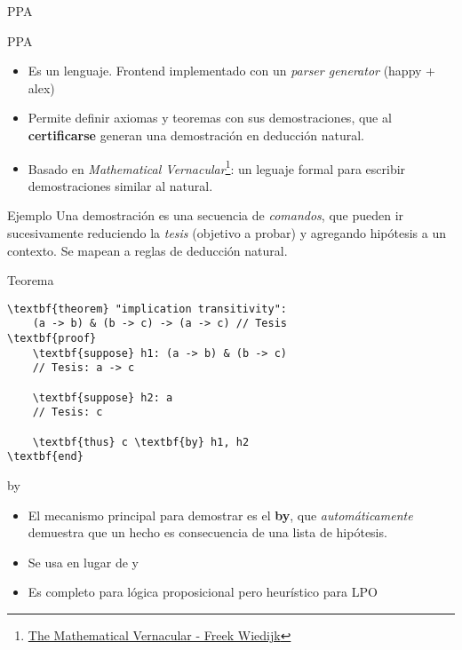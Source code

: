 \documentclass[xcolor={dvipsnames},spanish]{beamer}
\begin{document}
\begin{frame}{PPA}
    \begin{figure}
    \centering
\end{figure}
\end{frame}

\begin{frame}{PPA}
    \begin{itemize}
        \item Es un lenguaje. Frontend implementado con un \textit{parser generator} (happy + alex)
        \item Permite definir axiomas y teoremas con sus demostraciones, que al \textbf{certificarse} generan una demostración en deducción natural.
        \item Basado en \textit{Mathematical Vernacular}\footnote{\href{https://www.cs.ru.nl/~freek/notes/mv.pdf}{The Mathematical Vernacular - Freek Wiedijk}}: un leguaje formal para escribir demostraciones similar al natural.
    \end{itemize}
\end{frame}


\begin{frame}[fragile]{Ejemplo}
    Una demostración es una secuencia de \textit{comandos}, que pueden ir sucesivamente reduciendo la \textit{tesis} (objetivo a probar) y agregando hipótesis a un contexto. Se mapean a reglas de deducción natural.

\begin{block}{Teorema}
    \begin{Verbatim}[commandchars=\\\{\}]
\textbf{theorem} "implication transitivity":
    (a -> b) & (b -> c) -> (a -> c) // Tesis
\textbf{proof}        
    \textbf{suppose} h1: (a -> b) & (b -> c)
    // Tesis: a -> c
    
    \textbf{suppose} h2: a
    // Tesis: c
    
    \textbf{thus} c \textbf{by} h1, h2
\textbf{end}
\end{Verbatim}

\end{block}
\end{frame}

\begin{frame}{by}
    \begin{itemize}
        \item El mecanismo principal para demostrar es el \textbf{by}, que \textit{automáticamente} demuestra que un hecho es consecuencia de una lista de hipótesis.
        \item Se usa en lugar de  y 
        \item Es completo para lógica proposicional pero heurístico para LPO
    \end{itemize}
\end{frame}
\end{document}
